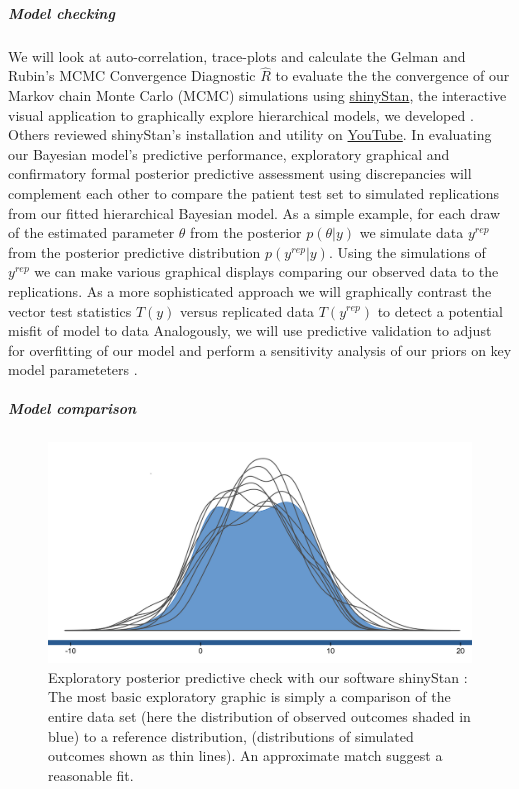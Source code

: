 \documentclass[11pt,notitlepage]{article}
\begin{document}
\subparagraph*{Model checking}
We will look at auto-correlation, trace-plots and calculate the Gelman and Rubin's MCMC Convergence Diagnostic $ \hat{R}$ to evaluate the the convergence of our Markov chain Monte Carlo (MCMC) simulations using \href{http://andrewgelman.com/2015/03/02/introducing-shinystan/}{shinyStan}, the interactive visual application to graphically explore hierarchical models, we developed \cite{shinystan-software:2015}. Others reviewed shinyStan's installation and utility on \href{https://www.youtube.com/watch?v=X31xqNHcvQs}{YouTube}. In evaluating our Bayesian model's predictive performance, exploratory graphical \cite{Gelman2004posteriorpredictivechecks} and confirmatory formal posterior predictive assessment using discrepancies \cite{GelmanMengStern1996} will complement each other to compare the patient test set to simulated replications from our fitted hierarchical Bayesian model. As a simple example, for each draw of the estimated parameter $\theta$ from the posterior $p(\theta|y)$ we simulate data $y^{rep}$ from the posterior predictive distribution $ p(y^{rep}|y) $. Using the simulations of $y^{rep}$ we can make various graphical displays comparing our observed data to the replications. As a more sophisticated approach we will graphically contrast the vector test statistics $T(y)$ versus replicated data $T(y^{rep})$ to detect a potential misfit of model to data \cite{Gelman2004posteriorpredictivechecks,Buja1999inference} Analogously, we will use predictive validation to adjust for overfitting of our model and perform a sensitivity analysis of our priors on key model parameteters \cite{Gelman-Hill_2014,Gelman_predictive_2000}.

\subparagraph*{Model comparison}

\begin{figure} 
 \vspace{-20pt}
 \includegraphics[scale=0.2]{Figures/posteriorpredictivecheck.png} 
  \caption{\footnotesize Exploratory posterior predictive check with our software shinyStan \cite{shinystan-software:2015}: The most basic exploratory graphic \cite{Gelman2004posteriorpredictivechecks} is simply a comparison of the entire data set (here the distribution of observed outcomes shaded in blue) to a reference distribution, (distributions of simulated outcomes shown as thin lines). An approximate match suggest a reasonable fit.}
  \label{fig:posteriorpredictivecheck}
  \vspace{-20pt}
\end{figure}
\end{document}
